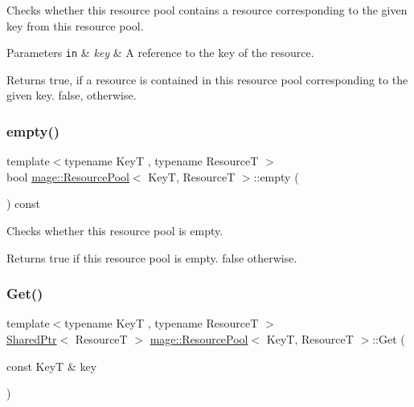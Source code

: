 Checks whether this resource pool contains a resource corresponding to the given key from this resource pool.


\begin{DoxyParams}[1]{Parameters}
\mbox{\tt in}  & {\em key} & A reference to the key of the resource. \\
\hline
\end{DoxyParams}
\begin{DoxyReturn}{Returns}
{\ttfamily true}, if a resource is contained in this resource pool corresponding to the given key. {\ttfamily false}, otherwise. 
\end{DoxyReturn}
\hypertarget{classmage_1_1_resource_pool_aa406e4382ec7047c5576d039d7adc424}{}\label{classmage_1_1_resource_pool_aa406e4382ec7047c5576d039d7adc424} 
\subsubsection{\texorpdfstring{empty()}{empty()}}
{\footnotesize\ttfamily template$<$typename KeyT , typename ResourceT $>$ \\
bool \hyperlink{classmage_1_1_resource_pool}{mage\+::\+Resource\+Pool}$<$ KeyT, ResourceT $>$\+::empty (\begin{DoxyParamCaption}{ }\end{DoxyParamCaption}) const\hspace{0.3cm}{\ttfamily [noexcept]}}

Checks whether this resource pool is empty.

\begin{DoxyReturn}{Returns}
{\ttfamily true} if this resource pool is empty. {\ttfamily false} otherwise. 
\end{DoxyReturn}
\hypertarget{classmage_1_1_resource_pool_abdd0bc69948404b0185ef7c417e95ff9}{}\label{classmage_1_1_resource_pool_abdd0bc69948404b0185ef7c417e95ff9} 
\subsubsection{\texorpdfstring{Get()}{Get()}}
{\footnotesize\ttfamily template$<$typename KeyT , typename ResourceT $>$ \\
\hyperlink{namespacemage_a1e01ae66713838a7a67d30e44c67703e}{Shared\+Ptr}$<$ ResourceT $>$ \hyperlink{classmage_1_1_resource_pool}{mage\+::\+Resource\+Pool}$<$ KeyT, ResourceT $>$\+::Get (\begin{DoxyParamCaption}\item[{const KeyT \&}]{key }\end{DoxyParamCaption})\hspace{0.3cm}{\ttfamily [noexcept]}}


